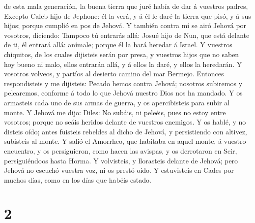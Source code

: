 de esta mala generación, la buena tierra que juré había de dar á
vuestros padres,  Excepto Caleb hijo de Jephone: él la
verá, y á él le daré la tierra que pisó, y á sus hijos; porque cumplió
en pos de Jehová.  Y también contra mí se airó Jehová por
vosotros, diciendo: Tampoco tú entrarás allá:  Josué hijo
de Nun, que está delante de ti, él entrará allá: anímale; porque él la
hará heredar á Israel.  Y vuestros chiquitos, de los cuales
dijisteis serán por presa, y vuestros hijos que no saben hoy bueno ni
malo, ellos entrarán allá, y á ellos la daré, y ellos la heredarán.
 Y vosotros volveos, y partíos al desierto camino del mar
Bermejo.  Entonces respondisteis y me dijisteis: Pecado
hemos contra Jehová; nosotros subiremos y pelearemos, conforme á todo lo
que Jehová nuestro Dios nos ha mandado. Y os armasteis cada uno de sus
armas de guerra, y os apercibisteis para subir al monte.  Y
Jehová me dijo: Diles: No subáis, ni peleéis, pues no estoy entre
vosotros; porque no seáis heridos delante de vuestros enemigos.
 Y os hablé, y no disteis oído; antes fuisteis rebeldes al
dicho de Jehová, y persistiendo con altivez, subisteis al monte.
 Y salió el Amorrheo, que habitaba en aquel monte, á
vuestro encuentro, y os persiguieron, como hacen las avispas, y os
derrotaron en Seir, persiguiéndoos hasta Horma.  Y
volvisteis, y llorasteis delante de Jehová; pero Jehová no escuchó
vuestra voz, ni os prestó oído.  Y estuvisteis en Cades por
muchos días, como en los días que habéis estado.

\hypertarget{section-1}{%
\section{2}\label{section-1}}

